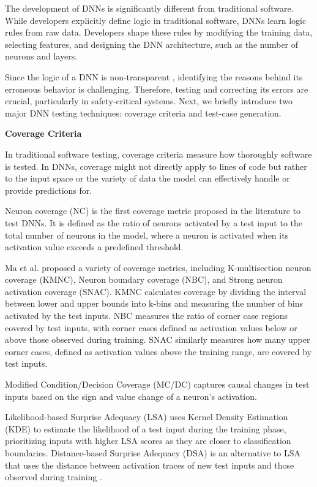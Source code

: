 The development of DNNs is significantly different from traditional software. While developers explicitly define logic in traditional software, DNNs learn logic rules from raw data. Developers shape these rules by modifying the training data, selecting features, and designing the DNN architecture, such as the number of neurons and layers.

Since the logic of a DNN is non-transparent \cite{deepxplore}, identifying the reasons behind its erroneous behavior is challenging. Therefore, testing and correcting its errors are crucial, particularly in safety-critical systems. Next, we briefly introduce two major DNN testing techniques: coverage criteria and test-case generation.

\smallskip\noindent%
\textbf{Coverage Criteria}

In traditional software testing, coverage criteria measure how thoroughly software is tested. In DNNs, coverage might not directly apply to lines of code but rather to the input space or the variety of data the model can effectively handle or provide predictions for.

Neuron coverage (NC) \cite{deepxplore} is the first coverage metric proposed in the literature to test DNNs. It is defined as the ratio of neurons activated by a test input to the total number of neurons in the model, where a neuron is activated when its activation value exceeds a predefined threshold.

Ma et al. \cite{deepguage} proposed a variety of coverage metrics, including K-multisection neuron coverage (KMNC), Neuron boundary coverage (NBC), and Strong neuron activation coverage (SNAC). KMNC calculates coverage by dividing the interval between lower and upper bounds into k-bins and measuring the number of bins activated by the test inputs. NBC measures the ratio of corner case regions covered by test inputs, with corner cases defined as activation values below or above those observed during training. SNAC similarly measures how many upper corner cases, defined as activation values above the training range, are covered by test inputs.

Modified Condition/Decision Coverage (MC/DC) \cite{SunY} captures causal changes in test inputs based on the sign and value change of a neuron's activation.

Likelihood-based Surprise Adequacy (LSA) uses Kernel Density Estimation (KDE) to estimate the likelihood of a test input during the training phase, prioritizing inputs with higher LSA scores as they are closer to classification boundaries. Distance-based Surprise Adequacy (DSA) is an alternative to LSA that uses the distance between activation traces of new test inputs and those observed during training \cite{KimJ}.

